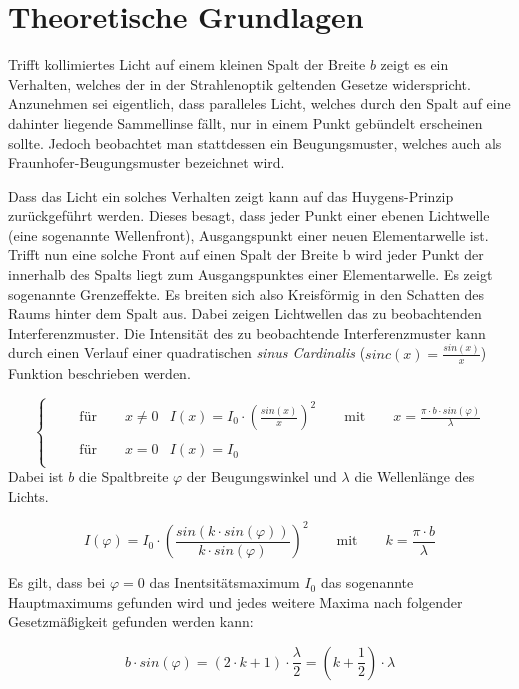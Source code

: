 
\setlength\abovedisplayshortskip{20pt}
\setlength\belowdisplayshortskip{20pt}
\setlength\abovedisplayskip{20pt}
\setlength\belowdisplayskip{20pt}


\section{Theoretische Grundlagen \cite{wedler}}

Trifft kollimiertes Licht auf einem kleinen Spalt der Breite $b$ zeigt es ein Verhalten, welches der in der Strahlenoptik geltenden Gesetze widerspricht. Anzunehmen sei eigentlich, dass paralleles Licht, welches durch den Spalt auf eine dahinter liegende Sammellinse fällt, nur in einem Punkt gebündelt erscheinen sollte. Jedoch beobachtet man stattdessen ein Beugungsmuster, welches auch als Fraunhofer-Beugungsmuster bezeichnet wird.



Dass das Licht ein solches Verhalten zeigt kann auf das Huygens-Prinzip zurückgeführt werden. Dieses besagt, dass jeder Punkt einer ebenen Lichtwelle (eine sogenannte Wellenfront), Ausgangspunkt einer neuen Elementarwelle ist. Trifft nun eine solche Front auf einen Spalt der Breite b wird jeder Punkt der innerhalb des Spalts liegt zum Ausgangspunktes einer Elementarwelle. Es zeigt sogenannte Grenzeffekte. Es breiten sich also Kreisförmig in den Schatten des Raums hinter dem Spalt aus. Dabei zeigen Lichtwellen das zu beobachtenden Interferenzmuster. Die  Intensität des zu beobachtende Interferenzmuster kann durch einen Verlauf einer quadratischen \textit{sinus Cardinalis} ($sinc(x)=\frac{sin(x)}{x}$) Funktion beschrieben werden.


\begin{equation}
 \begin{cases}\quad \quad
  \text{für} \quad \quad   x\neq 0 & I(x)=I_0 \cdot\left(\frac{sin(x)}{x}\right)^2 \quad \quad \text{mit} \quad \quad x =\frac{\pi \cdot b\cdot sin(\varphi)}{\lambda}  \\\\ \quad \quad
  \text{für} \quad \quad    x=0 & I(x)=I_0\\    
   \end{cases}
\end{equation}
Dabei ist $b$ die Spaltbreite $\varphi$ der Beugungswinkel und $\lambda$ die Wellenlänge des Lichts.


\begin{equation}
I(\varphi)=I_0 \cdot\left(\frac{sin(k\cdot sin(\varphi) )}{k\cdot sin(\varphi)}\right)^2 \quad \quad \text{mit} \quad \quad k =\frac{\pi \cdot b}{\lambda }
\end{equation}

Es gilt, dass bei $\varphi=0$ das Inentsitätsmaximum $I_0$ das sogenannte Hauptmaximums gefunden wird und jedes weitere Maxima nach folgender Gesetzmäßigkeit gefunden werden kann:




\begin{equation}
b\cdot sin(\varphi)=(2 \cdot k+1)\cdot \frac{\lambda}{2}=\left(k+\frac{1}{2}\right)\cdot \lambda
\end{equation} 

